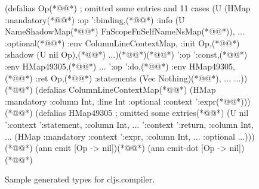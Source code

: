 \begin{figure}
\begin{cljlistingnumbered}
  (defalias Op(*@\label{infer:listing:cljs:Op}@*) ; omitted some entries and 11 cases
    (U (HMap :mandatory(*@\label{infer:listing:cljs:Op:op:bindingStart}@*)
             {:op ':binding,(*@\label{infer:listing:cljs:Op:op:binding}@*) :info (U NameShadowMap(*@\label{infer:listing:cljs:Op:op:binding:NameShadowMap}@*) FnScopeFnSelfNameNsMap(*@\label{infer:listing:cljs:Op:op:binding:FnScopeFnSelfNameNsMap}@*)), ...}
             :optional(*@\label{infer:listing:cljs:Op:optional}@*)
             {:env ColumnLineContextMap, :init Op,(*@\label{infer:listing:cljs:Op:optional:init:Op}@*) :shadow (U nil Op),(*@\label{infer:listing:cljs:Op:optional:shadow:Op}@*) ...})(*@\label{infer:listing:cljs:Op:optionalEnd}@*)(*@\label{infer:listing:cljs:Op:op:bindingEnd}@*)
      '{:op ':const,(*@\label{infer:listing:cljs:Op:op:const}@*) :env HMap49305,(*@\label{infer:listing:cljs:Op:op:const:HMap49305}@*) ...}
      '{:op ':do,(*@\label{infer:listing:cljs:Op:op:do}@*) :env HMap49305,(*@\label{infer:listing:cljs:Op:op:do:HMap49305}@*) :ret Op,(*@\label{infer:listing:cljs:Op:op:do:Op}@*) :statements (Vec Nothing)(*@\label{infer:listing:cljs:Op:op:do:statements}@*), ...}
      ...))(*@\label{infer:listing:cljs:Op-End}@*)
  (defalias ColumnLineContextMap(*@\label{infer:listing:cljs:ColumnLineContextMap}@*)
    (HMap :mandatory {:column Int, :line Int} :optional {:context ':expr}(*@\label{infer:listing:cljs:ColumnLineContextMap:optional}@*)))(*@\label{infer:listing:cljs:ColumnLineContextMapEnd}@*)
  (defalias HMap49305 ; omitted some extries(*@\label{infer:listing:cljs:HMap49305}@*)
    (U nil
       '{:context ':statement, :column Int, ...}
       '{:context ':return, :column Int, ...}
       (HMap :mandatory {:context ':expr, :column Int, ...} :optional {...})))(*@\label{infer:listing:cljs:HMap49305End}@*)
  (ann emit [Op -> nil])(*@\label{infer:listing:cljs:emit}@*)
  (ann emit-dot [Op -> nil])(*@\label{infer:listing:cljs:emit-dot}@*)
\end{cljlistingnumbered}
\caption{Sample generated types for cljs.compiler.
}
\label{infer:fig:cljs}

\end{figure}
